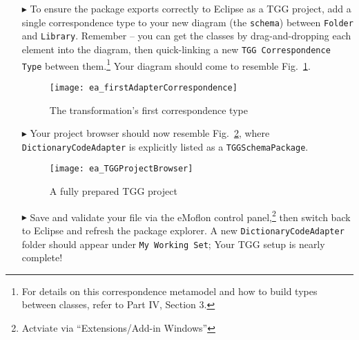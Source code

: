 \begin{itemize}

\item[$\blacktriangleright$] To ensure the package exports correctly to Eclipse as a TGG project, add a single correspondence type to your new
diagram (the \texttt{schema}) between \texttt{Folder} and \texttt{Library}. Remember -- you can get the classes by drag-and-dropping each element into the
diagram, then quick-linking a new \texttt{TGG Correspondence Type} between them.\footnote{For details on this correspondence metamodel and how to build types
between classes, refer to Part IV, Section 3.} Your diagram should come to resemble Fig.~\ref{ea:firstCorrType}.

\vspace{0.5cm}

\begin{figure}[htpb]
\begin{center}
  \texttt{[image: ea\_firstAdapterCorrespondence]}
  \caption{The transformation's first correspondence type}
  \label{ea:firstCorrType}
\end{center}
\end{figure}

\item[$\blacktriangleright$] Your project browser should now resemble Fig.~\ref{ea:TGGProjBrow}, where \texttt{Dict\-ion\-ary\-Code\-Adap\-ter} is
explicitly listed as a \texttt{TGGSchemaPackage}.

\vspace{0.5cm}

\begin{figure}[htpb]
\begin{center}
  \texttt{[image: ea\_TGGProjectBrowser]}
  \caption{A fully prepared TGG project}
  \label{ea:TGGProjBrow}
\end{center}
\end{figure}

\item[$\blacktriangleright$] Save and validate your file via the eMoflon control panel,\footnote{Actviate via ``Extensions/Add-in Windows''} then switch
back to Eclipse and refresh the package explorer. A new \texttt{Dict\-ion\-ary\-Code\-Adap\-ter} folder should appear under \texttt{My Working Set}; Your TGG setup
is nearly complete!


\end{itemize}
